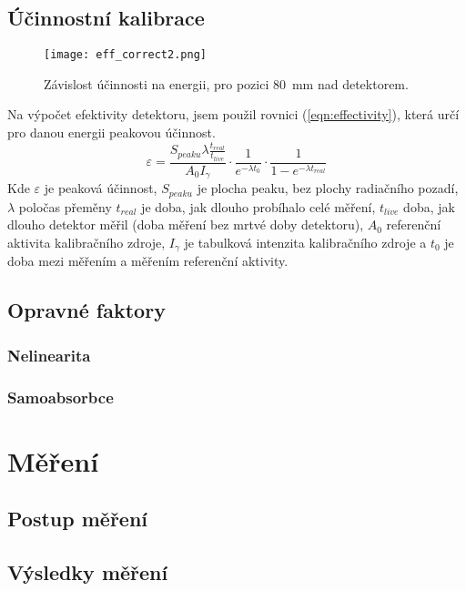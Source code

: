 \subsection{Účinnostní kalibrace}
\begin{figure}[h!]
	\renewcommand\figurename{Graf}
	\centering
	\texttt{[image: eff\_correct2.png]}%
	\caption{Závislost účinnosti na energii, pro pozici \SI{80}{\milli\metre} nad detektorem.}
	\label{fig:EFFvsENG5mm}
\end{figure}
Na výpočet efektivity detektoru, jsem použil rovnici  (\ref{eqn:effectivity}), která určí pro danou energii peakovou účinnost.
\begin{equation}
	\label{eqn:effectivity}
	\varepsilon = \frac{S_{peaku}\lambda\frac{t_{real}}{t_{live}}}{A_0 I_\gamma}\cdot\frac{1}{e^{-\lambda t_0}}\cdot\frac{1}{1-e^{-\lambda t_{real}}}
\end{equation}
Kde $\varepsilon$ je peaková účinnost, $S_{peaku}$ je plocha peaku, bez plochy radiačního pozadí, $\lambda$ poločas přeměny  $t_{real}$ je doba, jak dlouho probíhalo celé měření, $t_{live}$ doba, jak dlouho detektor měřil (doba měření bez mrtvé doby detektoru), $A_0$ referenční aktivita kalibračního zdroje,  $I_\gamma$ je tabulková intenzita kalibračního zdroje a $t_0$ je doba mezi měřením a měřením referenční aktivity.
\subsection{Opravné faktory}
\subsubsection{Nelinearita}
\subsubsection{Samoabsorbce}
\section{Měření}
\subsection{Postup měření}%
\subsection{Výsledky měření} %
\newpage